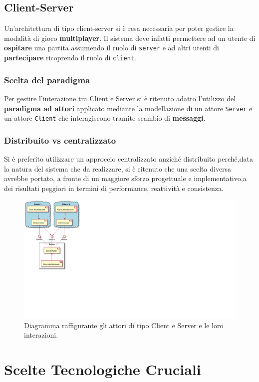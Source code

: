 \subsection{Client-Server} 
Un'architettura di tipo client-server si è resa necessaria per poter gestire la modalità di gioco \textbf{multiplayer}. Il sistema deve infatti permettere ad un utente di \textbf{ospitare} una partita assumendo il ruolo di \texttt{server} e ad altri utenti di \textbf{partecipare} ricoprendo il ruolo di \texttt{client}. 

\subsubsection{Scelta del paradigma}
Per gestire l'interazione tra Client e Server si è ritenuto adatto l'utilizzo del \textbf{paradigma ad attori} applicato mediante la modellazione di un attore \texttt{Server} e un attore \texttt{Client} che interagiscono tramite scambio di \textbf{messaggi}. 

\subsubsection{Distribuito vs centralizzato}
Si è preferito utilizzare un approccio centralizzato anziché distribuito perché,data la natura del sistema che da realizzare, si è ritenuto che una scelta diversa avrebbe portato, a fronte di un maggiore sforzo progettuale e implementativo,a dei risultati peggiori in termini di performance, reattività e consistenza.
\begin{figure}[H]
	\centering
	\includegraphics[width=0.70\columnwidth]{plantuml/rendered/componentDiagrams/clientServerComponentDiagram.pdf}
	\caption{Diagramma raffigurante gli attori di tipo Client e Server e le loro interazioni.}
	\label{fig:clientServerComponentDiagram}
\end{figure}

\section{Scelte Tecnologiche Cruciali}
